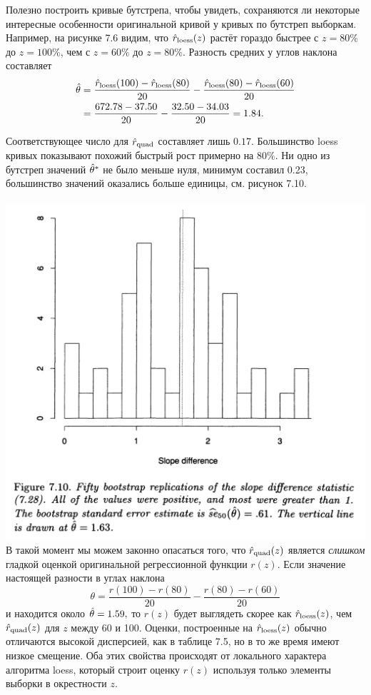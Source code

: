 Полезно построить кривые бутстрепа, чтобы увидеть, сохраняются ли некоторые интересные особенности оригинальной кривой у кривых по бутстреп выборкам. Например, на рисунке 7.6 видим, что $\hat{r}_{\text{loess}}(z)$ растёт гораздо быстрее с $z = 80\%$ до $z = 100\%$, чем с $z = 60\%$ до $z = 80\%$. Разность средних у углов наклона составляет
\begin{align}
	\hat \theta &= \frac{\hat{r}_{\text{loess}}(100) - \hat{r}_{\text{loess}}(80)}{20} - \frac{\hat{r}_{\text{loess}}(80) - \hat{r}_{\text{loess}}(60)}{20}\nonumber \\
	&= \frac{672.78 - 37.50}{20} - \frac{32.50 - 34.03}{20} = 1.84.
\end{align}
  
Соответствующее число для $\hat{r}_{\text{quad}}$ составляет лишь $0.17$. Большинство loess кривых показывают похожий быстрый рост примерно на $80\%$. Ни одно из бутстреп значений $\hat \theta^*$ не было меньше нуля, минимум составил 0.23, большинство значений оказались больше единицы, см. рисунок 7.10.
\\~\\
\noindent
\includegraphics[width=0.9\linewidth]{6/f710.png}
\newline
\setcounter{figure}{10}
В такой момент мы можем законно опасаться того, что $\hat{r}_{\text{quad}}(z)$ является \textit{слишком} гладкой оценкой оригинальной регрессионной функции $r(z)$. Если значение настоящей разности в углах наклона
\begin{equation}
  \theta = \frac{r(100) - r(80)}{20} - \frac{r(80) - r(60)}{20}
\end{equation}
и находится около $\hat \theta = 1.59,$ то $r(z)$ будет выглядеть скорее как 
$\hat{r}_{\text{loess}}(z)$, чем $\hat{r}_{\text{quad}}(z)$ для $z$ между 60 и 100. Оценки, построенные на $\hat{r}_{\text{loess}}(z)$ обычно отличаются высокой дисперсией, как в таблице 7.5, но в то же время имеют низкое смещение. Оба этих свойства происходят от локального характера алгоритма loess, который строит оценку $r(z)$ используя только элементы выборки в окрестности $z$.

